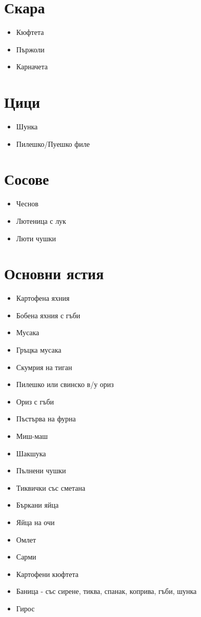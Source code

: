 \documentclass{article}
\newenvironment{mylist}
{
  \begin{itemize}
  \setlength{\itemsep}{1pt}
  \setlength{\parskip}{0pt}
  \setlength{\parsep}{0pt}
}
{
\end{itemize}
}
\begin{document}
\begin{multicols}{2}
\section{Скара}
\begin{mylist}
    \item{Кюфтета}
    \item{Пържоли}
    \item{Карначета}
\end{mylist}

\section{Цици}
\begin{mylist}
    \item{Шунка}
    \item{Пилешко/Пуешко филе}
\end{mylist}

\section{Сосове}
\begin{mylist}
    \item{Чеснов}
    \item{Лютеница с лук}
    \item{Люти чушки}
\end{mylist}

\section{Основни ястия}
\begin{mylist}
    \item{Картофена яхния}
    \item{Бобена яхния с гъби}
    \item{Мусака}
    \item{Гръцка мусака}
    \item{Скумрия на тиган}
    \item{Пилешко или свинско в/у ориз}
    \item{Ориз с гъби}
    \item{Пъстърва на фурна}
    \item{Миш-маш}
    \item{Шакшука}
    \item{Пълнени чушки}
    \item{Тиквички със сметана}
    \item{Бъркани яйца}
    \item{Яйца на очи}
    \item{Омлет}
    \item{Сарми}
    \item{Картофени кюфтета}
    \item{Баница - със сирене, тиква, спанак, коприва, гъби, шунка}
    \item{Гирос}
\end{mylist}


\end{multicols}
\end{document}
